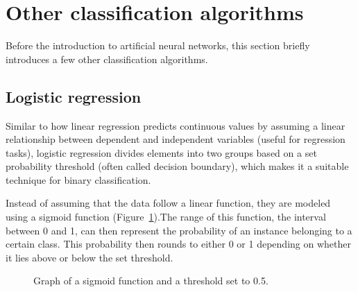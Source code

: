 \section{Other classification algorithms}
\label{other-classification-algorithms}
Before the introduction to artificial neural networks, this section briefly introduces a few other classification algorithms.


\subsection*{Logistic regression}
\label{logistic-regression}
Similar to how linear regression predicts continuous values by assuming a linear relationship
between dependent and independent variables (useful for regression tasks), logistic regression divides elements 
into two groups based on a set probability threshold (often called decision boundary),
which makes it a suitable technique for binary classification.

Instead of assuming that the data follow a linear function, they are modeled
using a sigmoid function (Figure~\ref{fig:sigmoid}).The range of this function, the interval between 0 and 1,
can then represent the probability of an instance belonging to a certain class.
This probability then rounds to either 0 or 1 depending on whether it lies above 
or below the set threshold.

\begin{figure}[!hb]
\centering
{}
\caption{Graph of a sigmoid function and a threshold set to 0.5.}
\label{fig:sigmoid}
\end{figure}




